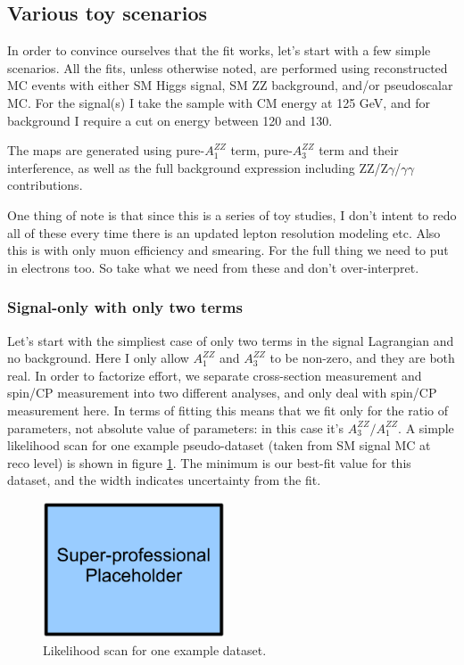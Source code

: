\documentclass{cmspaper}
\begin{document}
\subsection{Various toy scenarios}

In order to convince ourselves that the fit works, let's start with a few
simple scenarios.  All the fits, unless otherwise noted, are performed
using reconstructed MC events with either SM Higgs signal, SM ZZ background,
and/or pseudoscalar MC.  For the signal(s) I take the sample with CM energy
at 125 GeV, and for background I require a cut on energy between 120 and 130.

The maps are generated using pure-$A_1^{ZZ}$ term, pure-$A_3^{ZZ}$ term
and their interference, as well as the full background expression including
ZZ/Z$\gamma$/$\gamma$$\gamma$ contributions.

One thing of note is that since this is a series of toy studies, I don't
intent to redo all of these every time there is an updated lepton resolution
modeling etc.  Also this is with only muon efficiency and smearing.
For the full thing we need to put in electrons too.  So take what we need
from these and don't over-interpret.


\subsubsection{Signal-only with only two terms}

Let's start with the simpliest case of only two terms in the signal
Lagrangian and no background.  Here I only allow $A_1^{ZZ}$ and $A_3^{ZZ}$
to be non-zero, and they are both real.  In order to factorize effort,
we separate cross-section measurement and spin/CP measurement into two
different analyses, and only deal with spin/CP measurement here.
In terms of fitting this means that we fit only for the ratio of parameters,
not absolute value of parameters: in this case it's $A_3^{ZZ} / A_1^{ZZ}$.
A simple likelihood scan for one example pseudo-dataset (taken from SM signal MC
at reco level) is shown in figure \ref{fig:A1A3FitLikelihoodScan}.
The minimum is our best-fit value for this dataset, and the width indicates
uncertainty from the fit.

\begin{figure}[htb!]
  \begin{center}
    \includegraphics[width=0.48\textwidth]{figures/PlaceHolder.pdf}
    \caption{Likelihood scan for one example dataset.}
    \label{fig:A1A3FitLikelihoodScan}
  \end{center}
\end{figure}
\end{document}
